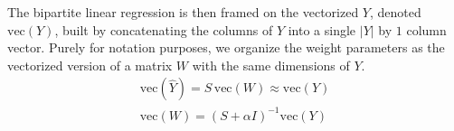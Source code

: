\documentclass[sn-mathphys-num]{sn-jnl}%
\theoremstyle{thmstyleone}%
\theoremstyle{thmstyletwo}%
\theoremstyle{thmstylethree}%
\begin{document}
\begin{appendices}
The bipartite linear regression is then framed on the vectorized $Y$, denoted $\text{vec}(Y)$, built by concatenating the columns of $Y$ into a single $|Y|$ by $1$ column vector.
Purely for notation purposes, we organize the weight parameters as the vectorized version of a matrix $W$ with the same dimensions of $Y$.
%
\begin{gather}
    \text{vec}(\hat Y) = S\,\text{vec}(W) \approx \text{vec}(Y)
    \\
    \text{vec}(W) = (S + \alpha I)^{-1} \text{vec}(Y)
\end{gather}



\end{appendices}
\end{document}
